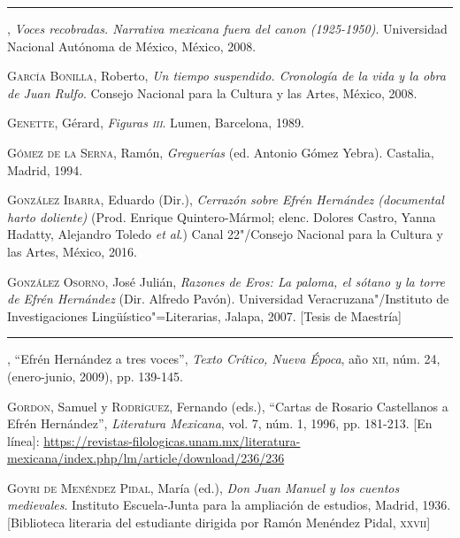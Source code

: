 \documentclass[14pt,twoside,final]{extbook} %
\begin{document}
\rule{1cm}{0.4pt}, \emph{Voces recobradas. Narrativa mexicana fuera del canon (1925-1950)}. Universidad Nacional Autónoma de México, México, 2008.\label{bib:franco2008}

\textsc{García Bonilla}, Roberto, \emph{Un tiempo suspendido. Cronología de la vida y la obra de Juan Rulfo}. Consejo Nacional para la Cultura y las Artes, México, 2008.\label{bib:garcia2008}

\textsc{Genette}, Gérard, \emph{Figuras \textsc{iii}}. Lumen, Barcelona, 1989.\label{bib:genette1989}

\textsc{Gómez de la Serna}, Ramón, \emph{Greguerías} (ed. Antonio Gómez Yebra). Castalia, Madrid, 1994.\label{bib:gomez1994}

\textsc{González Ibarra}, Eduardo (Dir.), \emph{Cerrazón sobre Efrén Hernández (documental harto doliente)} (Prod. Enrique Quintero-Mármol; elenc. Dolores Castro, Yanna Hadatty, Alejandro Toledo \emph{et al}.) Canal 22"/Consejo Nacional para la Cultura y las Artes, México, 2016.\label{bib:gonzalez2016}

\textsc{González Osorno}, José Julián, \emph{Razones de Eros: \emph{La paloma, el sótano y la torre} de Efrén Hernández} (Dir. Alfredo Pavón). Universidad Veracruzana"/Instituto de Investigaciones Lingüístico"=Literarias, Jalapa, 2007. [Tesis de Maestría]\label{bib:gonzalez2007}

\rule{1cm}{0.4pt}, ``Efrén Hernández a tres voces'', \emph{Texto Crítico, Nueva Época}, año \textsc{xii}, núm. 24, (enero-junio, 2009), pp. 139-145.\label{bib:gonzalez2009}

\textsc{Gordon}, Samuel y \textsc{Rodríguez}, Fernando (eds.), ``Cartas de Rosario Castellanos a Efrén Hernández'', \emph{Literatura Mexicana}, vol. 7, núm. 1, 1996, pp. 181-213. [En línea]: \href{https://revistas-filologicas.unam.mx/literatura-mexicana/index.php/lm/article/download/236/236}{https://revistas-filologicas.unam.mx/literatura-mexicana/index.php/lm/article/download/236/236}\label{bib:gordon-rodriguez1996} 

\textsc{Goyri de Menéndez Pidal}, María (ed.), \emph{Don Juan Manuel y los cuentos medievales}. Instituto Escuela-Junta para la ampliación de estudios, Madrid, 1936. [Biblioteca literaria del estudiante dirigida por Ramón Menéndez Pidal, \textsc{xxvii}]\label{bib:goyri1936}
\end{document}
